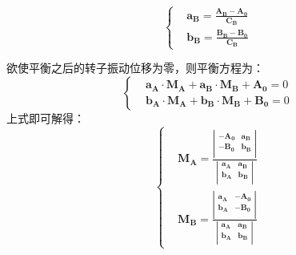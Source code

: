 \documentclass[
  lang=cn,
  degree=master,
  openany,oneside
]{nuaathesis}
\begin{document}
\begin{equation}
\left\{
\begin{aligned}
&	{\boldsymbol{a_B}} = \frac{{\boldsymbol{A_B}}-{\boldsymbol{A_0}}}{{\boldsymbol{C_B}}} \\
&		{\boldsymbol{b_B}} = \frac{{\boldsymbol{B_B}}-{\boldsymbol{B_0}}}{{\boldsymbol{C_B}}}
\end{aligned}
\right.
\end{equation}

欲使平衡之后的转子振动位移为零，则平衡方程为：
\begin{equation}
\left\{
\begin{aligned}
&	{\boldsymbol{a_A}}\cdot{\boldsymbol{M_A}} + {\boldsymbol{a_B}}\cdot{\boldsymbol{M_B}} + {\boldsymbol{A_0}} = 0 \\
&	{\boldsymbol{b_A}}\cdot{\boldsymbol{M_A}} + {\boldsymbol{b_B}}\cdot{\boldsymbol{M_B}} + {\boldsymbol{B_0}} = 0
\end{aligned}
\right.
\end{equation}
上式即可解得：
\begin{equation}
\label{eq:4-coff_m}
\left\{
\begin{aligned}
&{\boldsymbol{M_A}} = \frac{\left|\begin{array}{ccc} 
   -{\boldsymbol{A_0}} &  {\boldsymbol{a_B}}  \\ 
   -{\boldsymbol{B_0}} &  {\boldsymbol{b_B}} \\ 
\end{array}\right| }{\left|\begin{array}{ccc} 
   {\boldsymbol{a_A}} &  {\boldsymbol{a_B}}  \\ 
   {\boldsymbol{b_A}} &  {\boldsymbol{b_B}} \\ 
\end{array}\right| } \\
&{\boldsymbol{M_B}} = \frac{\left|\begin{array}{ccc} 
   {\boldsymbol{a_A}} &  -{\boldsymbol{A_0}}  \\ 
   {\boldsymbol{b_A}} &  -{\boldsymbol{B_0}} \\ 
\end{array}\right| }{\left|\begin{array}{ccc} 
   {\boldsymbol{a_A}} &  {\boldsymbol{a_B}}  \\ 
   {\boldsymbol{b_A}} &  {\boldsymbol{b_B}} \\ 
\end{array}\right| }	
\end{aligned}
\right.
\end{equation}
\end{document}
